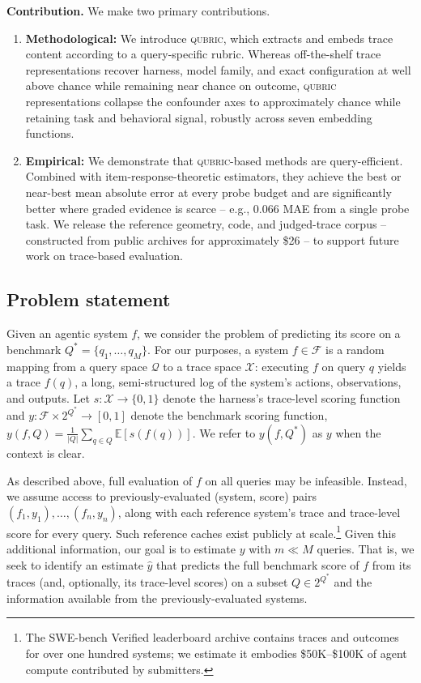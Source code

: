 \documentclass{article}
\newcommand{\qubric}{\textsc{qubric}}
\begin{document}
\noindent \textbf{Contribution.} We make two primary contributions.
\begin{enumerate}[itemsep=0pt, topsep=0pt, parsep=2pt]
\item \textbf{Methodological:} We introduce \qubric{}, which extracts and embeds trace content according to a query-specific rubric.
Whereas off-the-shelf trace representations recover harness, model family, and exact configuration at well above chance while remaining near chance on outcome, \qubric{} representations collapse the confounder axes to approximately chance while retaining task and behavioral signal, robustly across seven embedding functions.
\item \textbf{Empirical:} We demonstrate that \qubric{}-based methods are query-efficient.
Combined with item-response-theoretic estimators, they achieve the best or near-best mean absolute error at every probe budget and are significantly better where graded evidence is scarce -- e.g., 0.066 MAE from a single probe task.
We release the reference geometry, code, and judged-trace corpus -- constructed from public archives for approximately \$26 -- to support future work on trace-based evaluation.
\end{enumerate}

\subsection{Problem statement}
\label{sec:problem}

Given an agentic system $f$, we consider the problem of predicting its score on a benchmark $Q^{*} = \{q_{1}, \hdots, q_{M}\}$.
For our purposes, a system $f \in \mathcal{F}$ is a random mapping from a query space $\mathcal{Q}$ to a trace space $\mathcal{X}$: executing $f$ on query $q$ yields a trace $f(q)$, a long, semi-structured log of the system's actions, observations, and outputs.
Let $s: \mathcal{X} \to \{0, 1\}$ denote the harness's trace-level scoring function and $y: \mathcal{F} \times 2^{Q^{*}} \to [0,1]$ denote the benchmark scoring function, $y(f, Q) = \frac{1}{|Q|} \sum_{q \in Q} \mathbb{E}[s(f(q))]$.
We refer to $y(f, Q^{*})$ as $y$ when the context is clear.

As described above, full evaluation of $f$ on all queries may be infeasible.
Instead, we assume access to previously-evaluated (system, score) pairs $(f_{1}, y_{1}), \hdots, (f_{n}, y_{n})$, along with each reference system's trace and trace-level score for every query.
Such reference caches exist publicly at scale.\footnote{The SWE-bench Verified leaderboard archive contains traces and outcomes for over one hundred systems; we estimate it embodies \$50K--\$100K of agent compute contributed by submitters.}
Given this additional information, our goal is to estimate $y$ with $m \ll M$ queries.
That is, we seek to identify an estimate $\hat{y}$ that predicts the full benchmark score of $f$ from its traces (and, optionally, its trace-level scores) on a subset $Q \in 2^{Q^{*}}$ and the information available from the previously-evaluated systems.
\end{document}
